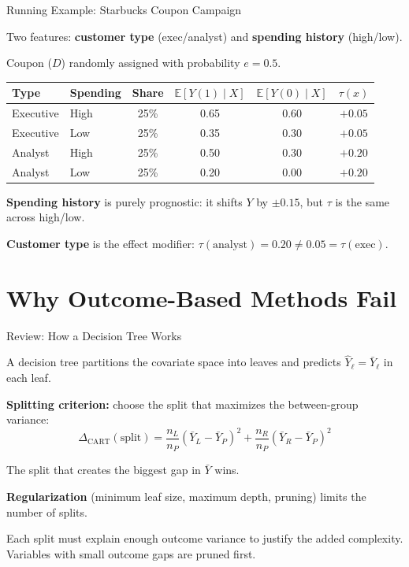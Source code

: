 \documentclass[aspectratio=169, 11pt, handout]{beamer}
\newcommand{\E}{\mathbb{E}}
\begin{document}
\begin{frame}{Running Example: Starbucks Coupon Campaign}
 
Two features: \textbf{customer type} (exec/analyst) and \textbf{spending history} (high/low).

Coupon ($D$) randomly assigned with probability $e = 0.5$.
 
\bigskip
 
\begin{center}
\begin{tabular}{llcccc}
\toprule
\textbf{Type} & \textbf{Spending} & \textbf{Share} & $\E[Y(1) \mid X]$ & $\E[Y(0) \mid X]$ & $\tau(x)$\\
\midrule
Executive & High & 25\% & 0.65 & 0.60 & $+0.05$ \\
Executive & Low  & 25\% & 0.35 & 0.30 & $+0.05$ \\
Analyst   & High & 25\% & 0.50 & 0.30 & $+0.20$ \\
Analyst   & Low  & 25\% & 0.20 & 0.00 & $+0.20$ \\
\bottomrule
\end{tabular}
\end{center}
 
\pause
\bigskip
 
\textbf{Spending history} is purely prognostic: it shifts $Y$ by $\pm 0.15$, but $\tau$ is the same across high/low.
 
\textbf{Customer type} is the effect modifier: $\tau(\text{analyst}) = 0.20 \neq 0.05 = \tau(\text{exec})$.
 
\end{frame}
 
 
\section{Why Outcome-Based Methods Fail}
 
\begin{frame}{Review: How a Decision Tree Works}
 
A decision tree partitions the covariate space into leaves and predicts $\hat{Y}_\ell = \bar{Y}_\ell$ in each leaf.
 
\bigskip
 
\textbf{Splitting criterion:} choose the split that maximizes the between-group variance:
\[
\Delta_{\text{CART}}(\text{split}) = \frac{n_L}{n_P}(\bar{Y}_L - \bar{Y}_P)^2 + \frac{n_R}{n_P}(\bar{Y}_R - \bar{Y}_P)^2
\]
 
The split that creates the biggest gap in $\bar{Y}$ wins.
 
\pause
\bigskip
 
\textbf{Regularization} (minimum leaf size, maximum depth, pruning) limits the number of splits.
 
Each split must explain enough outcome variance to justify the added complexity. Variables with small outcome gaps are pruned first.
 
\end{frame}
 
\end{document}
